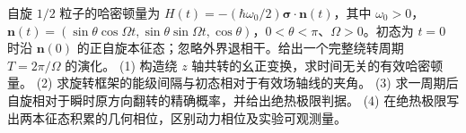 自旋 \(1/2\) 粒子的哈密顿量为 \(H(t)=-(\hbar\omega_0/2)\boldsymbol\sigma\cdot\mathbf n(t)\)，其中 \(\omega_0>0\)，\(\mathbf n(t)=(\sin\theta\cos\Omega t,\sin\theta\sin\Omega t,\cos\theta)\)，\(0<\theta<\pi\)、\(\Omega>0\)。初态为 \(t=0\) 时沿 \(\mathbf n(0)\) 的正自旋本征态；忽略外界退相干。给出一个完整绕转周期 \(T=2\pi/\Omega\) 的演化。
(1) 构造绕 \(z\) 轴共转的幺正变换，求时间无关的有效哈密顿量。
(2) 求旋转框架的能级间隔与初态相对于有效场轴线的夹角。
(3) 求一周期后自旋相对于瞬时原方向翻转的精确概率，并给出绝热极限判据。
(4) 在绝热极限写出两本征态积累的几何相位，区别动力相位及实验可观测量。
